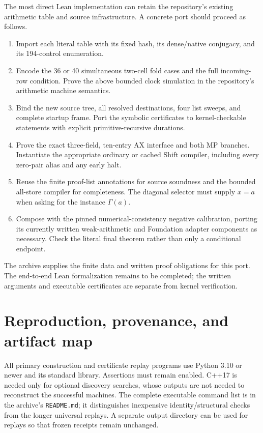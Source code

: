 \documentclass[11pt,letterpaper]{article}
\theoremstyle{definition}
\newcommand{\code}[1]{\texttt{#1}}
\begin{document}
The most direct Lean implementation can retain the repository's existing
arithmetic table and source infrastructure. A concrete port should proceed
as follows.
\begin{enumerate}
\item Import each literal table with its fixed hash, its dense/native
      conjugacy, and its 194-control enumeration.
\item Encode the 36 or 40 simultaneous two-cell fold cases and the full
      incoming-row condition. Prove the above bounded clock simulation in
      the repository's arithmetic machine semantics.
\item Bind the new source tree, all resolved destinations, four list
      sweeps, and complete startup frame. Port the symbolic certificates to
      kernel-checkable statements with explicit primitive-recursive
      durations.
\item Prove the exact three-field, ten-entry AX interface and both MP
      branches. Instantiate the appropriate ordinary or cached Shift
      compiler, including every zero-pair alias and any early halt.
\item Reuse the finite proof-list annotations for source soundness and the
      bounded all-store compiler for completeness. The diagonal selector
      must supply $x=a$ when asking for the instance $\Gamma(a)$.
\item Compose with the pinned numerical-consistency negative calibration,
      porting its currently written weak-arithmetic and Foundation adapter
      components as necessary. Check the literal final theorem rather than
      only a conditional endpoint.
\end{enumerate}
The archive supplies the finite data and written proof obligations for this
port. The end-to-end Lean formalization remains to be completed; the written
arguments and executable certificates are separate from kernel verification.

\section{Reproduction, provenance, and artifact map}
\label{sec:reproduction}
All primary construction and certificate replay programs use Python 3.10 or
newer and its standard library. Assertions must remain enabled. C++17 is
needed only for optional discovery searches, whose outputs are not needed
to reconstruct the successful machines. The complete executable command
list is in the archive's \code{README.md}; it distinguishes inexpensive
identity/structural checks from the longer universal replays. A separate
output directory can be used for replays so that frozen receipts remain
unchanged.
\end{document}
